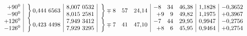 \[\begin{array}{r|c|r|c|r|r|r}
\begin{array}{@{}r@{}}+90^{0}\\-90^{0}\end{array}&\left.\vphantom{\begin{array}{c}0\\0\end{array}}\right\}0{,}444\ 6563&\begin{array}{@{}r@{}}8{,}007\ 0532\\8{,}015\ 2581\end{array}&\left.\vphantom{\begin{array}{c}0\\0\end{array}}\right\}\mp8\quad57\quad24{,}14&\begin{array}{@{}r@{}}-8\quad34\quad46{,}38\\+9\quad9\quad49{,}82\end{array}&\begin{array}{@{}r@{}}1{,}1828\\1{,}1975\end{array}&\begin{array}{@{}r@{}}-0{,}3652\\+0{,}3967\end{array}\\[3pt]
\begin{array}{@{}r@{}}+126^{0}\\-126^{0}\end{array}&\left.\vphantom{\begin{array}{c}0\\0\end{array}}\right\}0{,}423\ 4498&\begin{array}{@{}r@{}}7{,}949\ 3412\\7{,}929\ 3295\end{array}&\left.\vphantom{\begin{array}{c}0\\0\end{array}}\right\}\mp7\quad41\quad47{,}10&\begin{array}{@{}r@{}}-7\quad44\quad29{,}95\\+8\quad6\quad45{,}95\end{array}&\begin{array}{@{}r@{}}0{,}9947\\0{,}9464\end{array}&\begin{array}{@{}r@{}}-0{,}2756\\+0{,}2754\end{array}\\[3pt]

\end{array}\]
